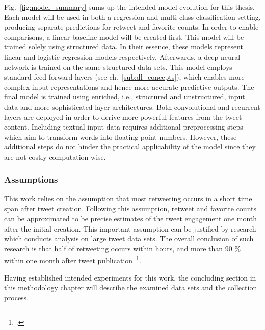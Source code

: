 Fig.~\ref{fig:model_summary} sums up the intended model evolution for this thesis.
Each model will be used in both a regression and multi-class classification
setting, producing separate predictions for retweet and favorite counts.
In order to enable comparisons, a linear baseline model will be created first.
This model will be trained solely using structured data.
In their essence, these models represent linear and logistic regression models
respectively.
Afterwards, a deep neural network is trained on the same structured data sets.
This model employs standard feed-forward layers (see ch.~\ref{sub:dl_concepts}),
which enables more complex input representations and hence more accurate
predictive outputs.
The final model is trained using enriched, i.e., structured and unstructured,
input data and more sophisticated layer architectures.
Both convolutional and recurrent layers are deployed in order to derive more
powerful features from the tweet content. 
Including textual input data requires additional preprocessing steps which aim
to transform words into floating-point numbers.
However, these additional steps do not hinder the practical applicability
of the model since they are not costly computation-wise.

\subsubsection{Assumptions}

This work relies on the assumption that most retweeting occurs in a short time
span after tweet creation.
Following this assumption, retweet and favorite counts can be approximated
to be precise estimates of the tweet engagement one month after the initial
creation.
This important assumption can be justified by research which conducts analysis
on large tweet data sets.
The overall conclusion of such research is that half of retweeting occurs within
hours, and more than 90 \% within one month after tweet publication~\footcite{Kwak2010, Kupavskii2012, Zaman2014}.

Having established intended experiments for this work, the concluding section
in this methodology chapter will describe the examined data sets and the
collection process.
